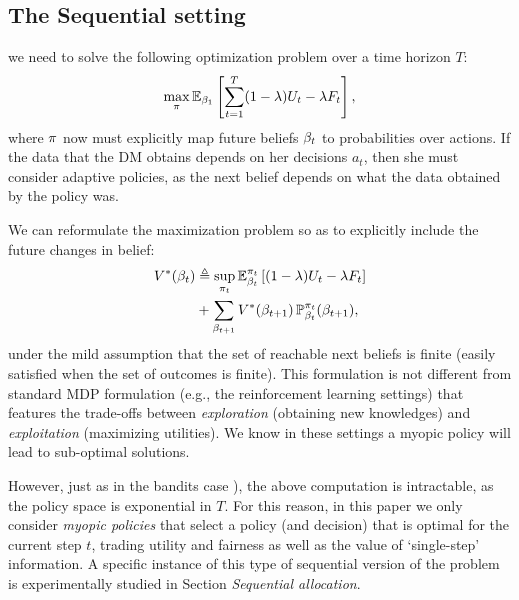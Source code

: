 \subsection{The Sequential setting}
\label{sec:sequential}
 we need to solve the following optimization problem over a
time horizon $T$:
%
\begin{align}
  \max_\pi \mathop{\mbox{\ensuremath{\mathbb{E}}}}\nolimits_{\beta_1} \left[\sum_{t=1}^T (1 - \lambda) U_t - \lambda F_t\right],
\end{align}
where $\pi$ now must explicitly map future beliefs $\beta_t$ to probabilities over actions.
 If the data that the DM obtains depends on her
decisions $a_t$, then she must consider adaptive policies, as the next
belief depends on what the data obtained by the policy was.

We can reformulate the maximization problem so as to explicitly include the future changes in belief:
\begin{align}
  V^*(\beta_t) &\mathrel{\triangleq} \sup_{\pi_t} \mathop{\mbox{\ensuremath{\mathbb{E}}}}\nolimits^{\pi_t}_{\beta_t} \left[(1 - \lambda) U_t - \lambda F_t\right]
          \nonumber \\
          &+ \sum_{\beta_{t+1}} V^*(\beta_{t+1}) \mathop{\mbox{\ensuremath{\mathbb{P}}}}\nolimits_{\beta_t}^{\pi_t} (\beta_{t+1}),
\end{align}
%
under the mild assumption that the set of reachable next beliefs is
finite (easily satisfied when the set of outcomes is finite). This formulation is not different from standard MDP formulation (e.g., the 
reinforcement learning settings) that features the trade-offs between \emph{exploration} (obtaining new knowledges) and \emph{exploitation} (maximizing utilities). We know in these settings a myopic policy will lead to sub-optimal solutions. 

However, just as in the bandits case \citep[c.f.][]{duff2002olc}), the
above computation is intractable, as the policy space is exponential in
$T$. For this reason, in this paper we only consider
{\em myopic policies}
that select a policy (and decision) that is optimal for the current
step $t$,
trading utility and fairness
as well as the value of `single-step' information.
%
%
A specific instance of this type of sequential version of the problem
is experimentally studied in Section {\em Sequential allocation}.%

